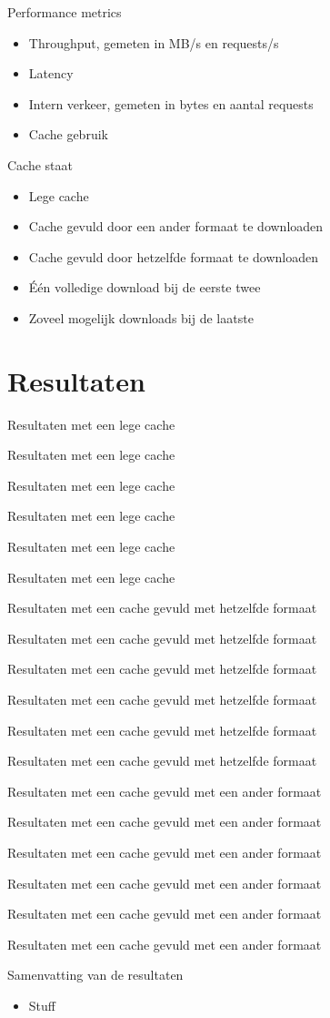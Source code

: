 \documentclass[xcolor=svgnames]{beamer}
\begin{document}
\begin{frame}{Performance metrics}
    \begin{itemize}
        \item Throughput, gemeten in MB/s en requests/s
        \item Latency
        \item Intern verkeer, gemeten in bytes en aantal requests
        \item Cache gebruik
    \end{itemize}
\end{frame}


\begin{frame}{Cache staat}
    \begin{itemize}
        \item Lege cache
        \item Cache gevuld door een ander formaat te downloaden
        \item Cache gevuld door hetzelfde formaat te downloaden\pause
        \item Één volledige download bij de eerste twee
        \item Zoveel mogelijk downloads bij de laatste
    \end{itemize}
\end{frame}

\section{Resultaten}
\newcommand{\frameplot}[3]{%
    \begin{frame}{Resultaten met een #1}
        
    \end{frame}
}

\newcommand{\plotframes}[2]{%
    \frameplot{#1}{#2}{cache_usage}
    \frameplot{#1}{#2}{internal_requests}
    \frameplot{#1}{#2}{internal_mb}
    \frameplot{#1}{#2}{mbps}
    \frameplot{#1}{#2}{requests_per_second}
    \frameplot{#1}{#2}{latency_mean}
}

\plotframes{lege cache}{first_time}
\plotframes{cache gevuld met hetzelfde formaat}{second_time}
\plotframes{cache gevuld met een ander formaat}{after_other}

\begin{frame}{Samenvatting van de resultaten}
    \begin{itemize}
        \item Stuff
    \end{itemize}
\end{frame}
\end{document}
